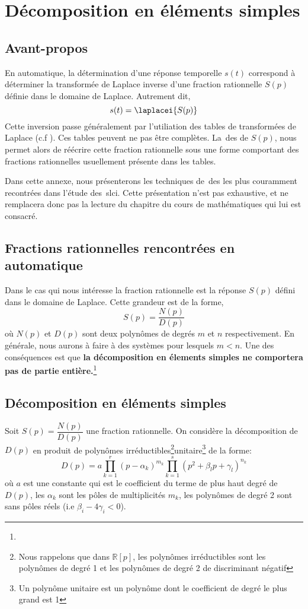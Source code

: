 \chapter{Décomposition en éléments simples\label{annexe-DES}}

\section{Avant-propos}
En automatique, la détermination d'une réponse temporelle $s(t)$
correspond à déterminer la transformée 
de Laplace inverse d'une fraction rationnelle $S(p)$ 
définie dans le domaine de Laplace. Autrement dit, 
$$
s(t)=\laplacei{S(p)}
$$
Cette inversion passe généralement par l'utiliation des tables de transformées de Laplace 
(c.f ).
Ces tables peuvent ne pas être complètes. La~\gls{des} de $S(p)$, nous permet alors de 
réécrire cette fraction rationnelle sous une forme comportant 
des fractions rationnelles usuellement présente dans les tables.

Dans cette annexe, nous présenterons les techniques de~\gls{des} les plus couramment
recontrées dans l'étude des~\gls{slci}. 
Cette présentation n'est pas exhaustive, et ne remplacera donc 
pas la lecture du chapitre du cours de mathématiques qui lui est consacré.

\section{Fractions rationnelles rencontrées en automatique}
Dans le cas qui nous intéresse la fraction rationnelle est la réponse $S(p)$ 
défini dans le domaine de Laplace.
Cette grandeur est de la forme,
$$
S(p)=\dfrac{N(p)}{D(p)}
$$
où $N(p)$ et $D(p)$ sont deux polynômes de degrés $m$ et $n$ respectivement.
En générale, nous aurons à faire à des systèmes pour lesquels $m<n$. 
Une des conséquences est que \textbf{la décomposition en élements simples ne comportera
pas de partie entière.}\footnote{}

\section{Décomposition en éléments simples}

Soit $S(p)=\dfrac{N(p)}{D(p)}$ une fraction rationnelle. On considère la décomposition 
de $D(p)$ en produit de polynômes irréductibles\footnote{Nous rappelons que 
dans $\mathbb{R}[p]$, les polynômes irréductibles sont 
les polynômes de degré 1 et les polynômes de degré 2 de discriminant négatif}unitaire\footnote{Un polynôme 
unitaire est un polynôme dont le coefficient de degré le plus grand est 1}
de la forme:
$$
D(p)=a\prod_{k=1}^r(p-\alpha_k)^{m_k}\prod_{k=1}^s(p^2+\beta_lp+\gamma_l)^{n_k}
$$
où $a$ est une constante qui est le coefficient du terme de plus haut degré de $D(p)$, les $\alpha_k$
sont les pôles de multiplicités $m_k$,  les polynômes de degré 2 sont sans pôles réels (i.e $\beta_i-4\gamma_i<0$).

